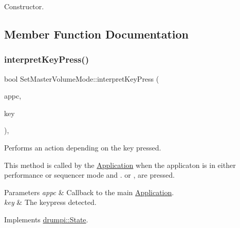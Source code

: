 Constructor. 

\subsection{Member Function Documentation}
\mbox{\label{classdrumpi_1_1SetMasterVolumeMode_a18b5f4d0181ea1fbfd958afc473e240f}} 
\subsubsection{\texorpdfstring{interpret\+Key\+Press()}{interpretKeyPress()}}
{\footnotesize\ttfamily bool Set\+Master\+Volume\+Mode\+::interpret\+Key\+Press (\begin{DoxyParamCaption}\item[{\hyperlink{classdrumpi_1_1ApplicationCallback}{Application\+Callback} $\ast$}]{appc,  }\item[{int}]{key }\end{DoxyParamCaption})\hspace{0.3cm}{\ttfamily [override]}, {\ttfamily [virtual]}}



Performs an action depending on the key pressed. 

This method is called by the \hyperlink{classdrumpi_1_1Application}{Application} when the applicaton is in either performance or sequencer mode and . or , are pressed. 
\begin{DoxyParams}{Parameters}
{\em appc} & Callback to the main \hyperlink{classdrumpi_1_1Application}{Application}. \\
\hline
{\em key} & The keypress detected. \\
\hline
\end{DoxyParams}


Implements \hyperlink{classdrumpi_1_1State_aaa6205d85513b3f717c126e0717e1dbd}{drumpi\+::\+State}.

\mbox{\label{classdrumpi_1_1SetMasterVolumeMode_ad8637f24eb5a7c11d829b8d41a9c46f2}} 
